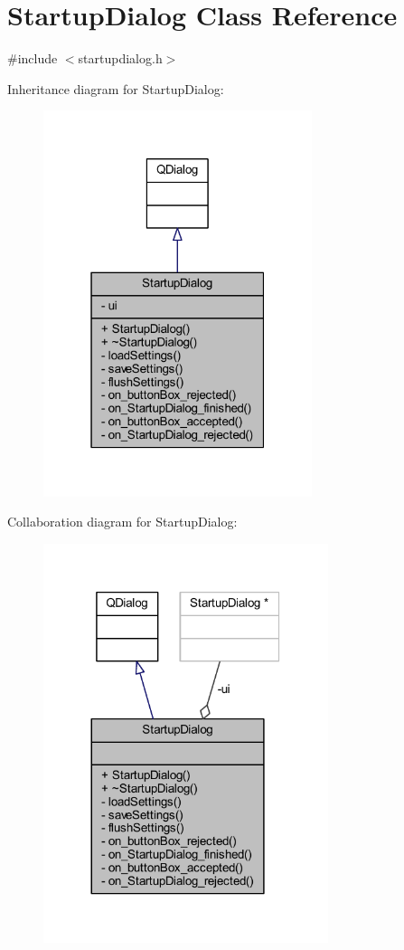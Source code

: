 \hypertarget{class_startup_dialog}{}\section{Startup\+Dialog Class Reference}
\label{class_startup_dialog}


{\ttfamily \#include $<$startupdialog.\+h$>$}



Inheritance diagram for Startup\+Dialog\+:
\nopagebreak
\begin{figure}[H]
\begin{center}
\leavevmode
\includegraphics[width=223pt]{class_startup_dialog__inherit__graph}
\end{center}
\end{figure}


Collaboration diagram for Startup\+Dialog\+:
\nopagebreak
\begin{figure}[H]
\begin{center}
\leavevmode
\includegraphics[width=236pt]{class_startup_dialog__coll__graph}
\end{center}
\end{figure}
